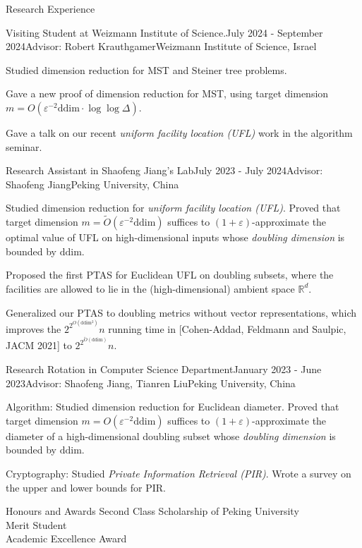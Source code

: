 \documentclass{resume} %
\begin{document}
\begin{rSection}{Research Experience}{}
    \begin{rSubsection}{Visiting Student at Weizmann Institute of Science.}{July 2024 - September 2024}{Advisor: Robert Krauthgamer}{Weizmann Institute of Science, Israel}
        \item Studied dimension reduction for MST and Steiner tree problems.
        \item Gave a new proof of dimension reduction for MST, using target dimension $m = O(\varepsilon^{-2} \mathrm{ddim} \cdot \log\log \Delta)$.
        \item Gave a talk on our recent \emph{uniform facility location (UFL)} work in the algorithm seminar.
    \end{rSubsection}

    \begin{rSubsection}{Research Assistant in Shaofeng Jiang's Lab}{July 2023 - July 2024}{Advisor: Shaofeng Jiang}{Peking University, China}
       \item Studied dimension reduction for \emph{uniform facility location (UFL)}. 
       Proved that target dimension $m = \tilde{O}(\varepsilon^{-2} \mathrm{ddim})$ suffices to $(1+\varepsilon)$-approximate the optimal value of UFL on high-dimensional inputs whose \emph{doubling dimension} is bounded by $\mathrm{ddim}$.
       \item Proposed the first PTAS for Euclidean UFL on doubling subsets, where the facilities are allowed to lie in the (high-dimensional) ambient space $\mathbb{R}^d$.
       \item Generalized our PTAS to doubling metrics without vector representations, which improves the $2^{2^{O(\mathrm{ddim^2})}} n$ running time in [Cohen-Addad, Feldmann and Saulpic, JACM 2021] to $2^{2^{\tilde O(\mathrm{ddim})}} n$.
    \end{rSubsection}

    \begin{rSubsection}{Research Rotation in Computer Science Department}{January 2023 - June 2023}{Advisor: Shaofeng Jiang, Tianren Liu}{Peking University, China}
        \item Algorithm: Studied dimension reduction for Euclidean diameter. 
        Proved that target dimension $m = O(\varepsilon^{-2} \mathrm{ddim})$ suffices to $(1+\varepsilon)$-approximate the diameter of a high-dimensional doubling subset whose \emph{doubling dimension} is bounded by $\mathrm{ddim}$.
        \item Cryptography: Studied \emph{Private Information Retrieval (PIR)}.
        Wrote a survey on the upper and lower bounds for PIR.
    \end{rSubsection}
\end{rSection}

\begin{rSection}{Honours and Awards}{}
    Second Class Scholarship of Peking University 
    \\ Merit Student 
    \\ Academic Excellence Award 
\end{rSection}
\end{document}
